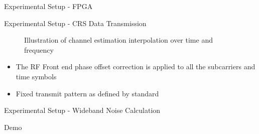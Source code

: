 \documentclass[10pt,t]{beamer}
\begin{document}
\begin{frame}{Experimental Setup - FPGA}
\end{frame}

\begin{frame}{Experimental Setup - CRS Data Transmission}
    \begin{figure}%
        \centering
        \qquad
        \caption{Illustration of channel estimation interpolation over time and frequency}%
    \end{figure}

    \pause
    \begin{itemize}
        \item The RF Front end phase offset correction is applied to all the subcarriers and time symbols
        \item Fixed transmit pattern as defined by standard
    \end{itemize}
\end{frame}

\begin{frame}{Experimental Setup - Wideband Noise Calculation}
\end{frame}

\begin{frame}{\huge Demo}
\end{frame}
\end{document}
